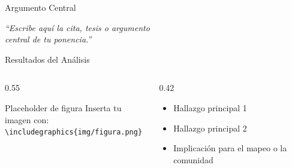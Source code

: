 \begin{frame}{Argumento Central}
  \vfill
  \begin{center}
    \color{SotmVerde}
    \Large\itshape
    ``Escribe aquí la cita, tesis o argumento\\
    central de tu ponencia.''
  \end{center}
  \vfill
\end{frame}

\begin{frame}{Resultados del Análisis}
  \begin{columns}[T]
    \begin{column}{0.55\textwidth}
      \begin{alertblock}{Placeholder de figura}
        Inserta tu imagen con:\\
        \texttt{\textbackslash includegraphics\{img/figura.png\}}
      \end{alertblock}
    \end{column}
    \begin{column}{0.42\textwidth}
      \begin{itemize}
        \item Hallazgo principal 1
        \item Hallazgo principal 2
        \item Implicación para el mapeo o la comunidad
      \end{itemize}
    \end{column}
  \end{columns}
\end{frame}

